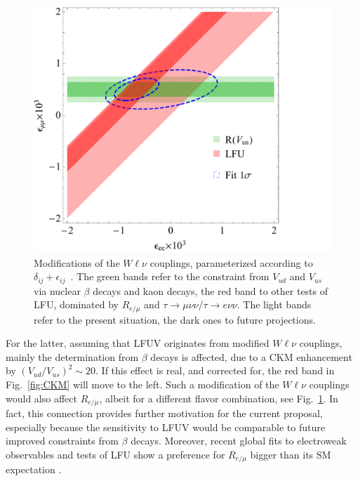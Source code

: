 \begin{figure}[t!]
\centering
\includegraphics[scale=0.5]{sections/figures/Fit.pdf}
\caption{Modifications of the $W\ell\nu$ couplings, parameterized according to $\delta_{ij}+\epsilon_{ij}$~\cite{Crivellin:2020lzu}. The green bands refer to the constraint from $V_{ud}$ and $V_{us}$ via nuclear $\beta$ decays and kaon decays, the red band to other tests of LFU, dominated by $R_{e/\mu}$ and $\tau\to\mu\nu\nu/\tau\to e\nu\nu$. The light bands refer to the present situation, the dark ones to future projections.}
\label{fig:Fit_epsii}
\end{figure}

For the latter,  assuming that LFUV  originates from modified $W\ell\nu$ couplings, mainly the determination from $\beta$ decays is affected, due to a CKM enhancement by $(V_{ud} / V_{us})^2 \sim 20$. If this effect is real, and corrected for, the red band in Fig.~\ref{fig:CKM} will move to the left. Such a modification of the $W\ell\nu$ couplings would also affect $R_{e/\mu}$, albeit for a different flavor combination, see Fig.~\ref{fig:Fit_epsii}. 
In fact, this connection provides further motivation for the current proposal, especially because the sensitivity to LFUV would be comparable to future improved constraints from $\beta$ decays. Moreover, recent global fits to electroweak observables and tests of LFU show a preference for $R_{e/\mu}$ bigger than its SM expectation \cite{Coutinho:2019aiy,Crivellin:2020ebi}.









